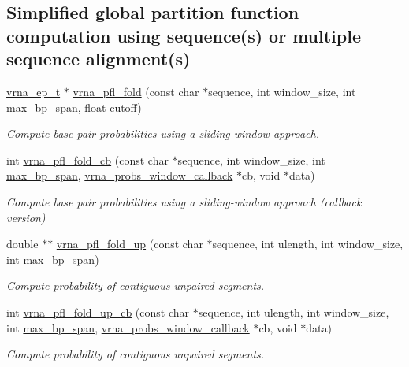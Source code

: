 \subsection*{Simplified global partition function computation using sequence(s) or multiple sequence alignment(s)}
\begin{DoxyCompactItemize}
\item 
\mbox{\hyperlink{group__struct__utils__plist_gab9ac98ab55ded9fb90043b024b915aca}{vrna\+\_\+ep\+\_\+t}} $\ast$ \mbox{\hyperlink{group__part__func__window_ga6267230f20cab0e2315375310b4dad85}{vrna\+\_\+pfl\+\_\+fold}} (const char $\ast$sequence, int window\+\_\+size, int \mbox{\hyperlink{group__model__details_ga18df869af0d70101106458fc3f027806}{max\+\_\+bp\+\_\+span}}, float cutoff)
\begin{DoxyCompactList}\small\item\em Compute base pair probabilities using a sliding-\/window approach. \end{DoxyCompactList}\item 
int \mbox{\hyperlink{group__part__func__window_ga457a60751b2a5225477e3b7735636a5f}{vrna\+\_\+pfl\+\_\+fold\+\_\+cb}} (const char $\ast$sequence, int window\+\_\+size, int \mbox{\hyperlink{group__model__details_ga18df869af0d70101106458fc3f027806}{max\+\_\+bp\+\_\+span}}, \mbox{\hyperlink{group__part__func__window_gabe710a1182e6db69cc75329dfc9bed67}{vrna\+\_\+probs\+\_\+window\+\_\+callback}} $\ast$cb, void $\ast$data)
\begin{DoxyCompactList}\small\item\em Compute base pair probabilities using a sliding-\/window approach (callback version) \end{DoxyCompactList}\item 
double $\ast$$\ast$ \mbox{\hyperlink{group__part__func__window_ga1dd5c51b797c961124912e289bff553a}{vrna\+\_\+pfl\+\_\+fold\+\_\+up}} (const char $\ast$sequence, int ulength, int window\+\_\+size, int \mbox{\hyperlink{group__model__details_ga18df869af0d70101106458fc3f027806}{max\+\_\+bp\+\_\+span}})
\begin{DoxyCompactList}\small\item\em Compute probability of contiguous unpaired segments. \end{DoxyCompactList}\item 
int \mbox{\hyperlink{group__part__func__window_gac3251d3da0238d6d9ffdd6703b00f1d3}{vrna\+\_\+pfl\+\_\+fold\+\_\+up\+\_\+cb}} (const char $\ast$sequence, int ulength, int window\+\_\+size, int \mbox{\hyperlink{group__model__details_ga18df869af0d70101106458fc3f027806}{max\+\_\+bp\+\_\+span}}, \mbox{\hyperlink{group__part__func__window_gabe710a1182e6db69cc75329dfc9bed67}{vrna\+\_\+probs\+\_\+window\+\_\+callback}} $\ast$cb, void $\ast$data)
\begin{DoxyCompactList}\small\item\em Compute probability of contiguous unpaired segments. \end{DoxyCompactList}\end{DoxyCompactItemize}


